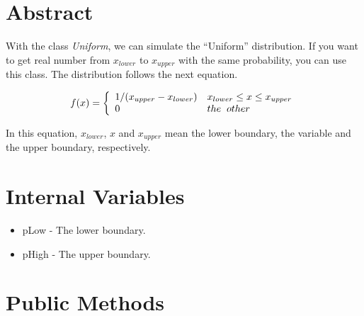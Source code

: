%

\section{Abstract}

\noindent
With the class {\em Uniform}, we can simulate the ``Uniform''
distribution. If you want to get real number from $x_{lower}$ to
$x_{upper}$ with the same probability, you can use this class. The
distribution follows the next equation.

\begin{equation}
f(x) = \left\{
\begin{array}{ll}
1 / ( x_{upper} - x_{lower} ) & x_{lower} \le x \le x_{upper} \\
0 & the \hspace{2mm} other
\end{array}
\right.
\end{equation}

\noindent
In this equation, $x_{lower}$, $x$ and $x_{upper}$ mean the lower
boundary, the variable and the upper boundary, respectively.

\vspace*{10mm}

\section{Internal Variables}

\begin{itemize}
\item pLow - The lower boundary.
\item pHigh - The upper boundary.
\end{itemize}


\clearpage

\section{Public Methods}

